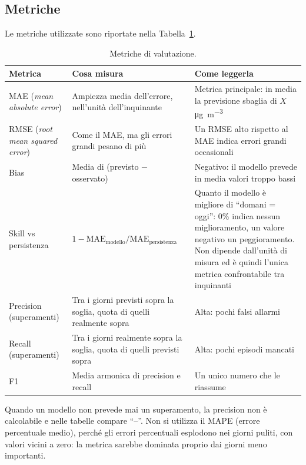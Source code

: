 \documentclass[11pt]{report}
\newcommand{\ugm}{\si{\micro\gram\per\cubic\metre}}
\begin{document}
\subsection{Metriche}
Le metriche utilizzate sono riportate nella Tabella~\ref{tab:fc_metriche}.

\begin{table}[H]
  \centering
  \caption{Metriche di valutazione.}
  \label{tab:fc_metriche}
  \small
  \begin{tabularx}{\textwidth}{@{}>{\raggedright\arraybackslash}p{3cm} >{\raggedright\arraybackslash}X >{\raggedright\arraybackslash}X@{}}
    \toprule
    \textbf{Metrica} & \textbf{Cosa misura} & \textbf{Come leggerla} \\
    \midrule
    MAE (\emph{mean absolute error}) & Ampiezza media dell'errore, nell'unità dell'inquinante & Metrica principale: in media la previsione sbaglia di $X$ \ugm \\
    \addlinespace
    RMSE (\emph{root mean squared error}) & Come il MAE, ma gli errori grandi pesano di più & Un RMSE alto rispetto al MAE indica errori grandi occasionali \\
    \addlinespace
    Bias & Media di (previsto $-$ osservato) & Negativo: il modello prevede in media valori troppo bassi \\
    \addlinespace
    Skill vs persistenza & $1 - \mathrm{MAE}_{\text{modello}} / \mathrm{MAE}_{\text{persistenza}}$ & Quanto il modello è migliore di ``domani = oggi'': 0\% indica nessun miglioramento, un valore negativo un peggioramento. Non dipende dall'unità di misura ed è quindi l'unica metrica confrontabile tra inquinanti \\
    \addlinespace
    Precision (superamenti) & Tra i giorni previsti sopra la soglia, quota di quelli realmente sopra & Alta: pochi falsi allarmi \\
    \addlinespace
    Recall (superamenti) & Tra i giorni realmente sopra la soglia, quota di quelli previsti sopra & Alta: pochi episodi mancati \\
    \addlinespace
    F1 & Media armonica di precision e recall & Un unico numero che le riassume \\
    \bottomrule
  \end{tabularx}
\end{table}

Quando un modello non prevede mai un superamento, la precision non è calcolabile e
nelle tabelle compare ``--''. Non si utilizza il MAPE (errore percentuale medio),
perché gli errori percentuali esplodono nei giorni puliti, con valori vicini a
zero: la metrica sarebbe dominata proprio dai giorni meno importanti.
\end{document}
